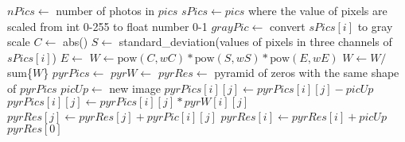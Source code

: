 \begin{algorithm}
\begin{algorithmic}[1]
  \State $nPics\gets$ number of photos in $pics$
  \State $sPics\gets pics$ where the value of pixels are scaled from int 0-255 to float number 0-1
    \State $grayPic\gets$ convert $sPics[i]$ to gray scale 
    \State $C\gets$ abs()
    \State $S\gets$ standard\_deviation(values of pixels in three channels of $sPics[i]$)
    \State $E\gets$ 
    \State $W\gets \mbox{pow}(C, wC) *\mbox{pow}(S, wS) *\mbox{pow}(E, wE)$
  \EndFor
  \State $W\gets W/$sum\{$W$\}
  \State $pyrPics\gets$ 
  \State $pyrW\gets$ 
  \State $pyrRes\gets$ pyramid of zeros with the same shape of $pyrPics$
  \State $picUp\gets$ new image
      \State {}
      \State $pyrPics[i][j]\gets pyrPics[i][j]-picUp$
    \EndFor
      \State $pyrPics[i][j]\gets pyrPics[i][j]*pyrW[i][j]$
      \State $pyrRes[j]\gets pyrRes[j]+pyrPic[i][j]$ 
    \EndFor
  \EndFor
    \State {}
    \State $pyrRes[i]\gets pyrRes[i]+picUp$
  \EndFor
  \State \Return $pyrRes[0]$
\EndFunction
\end{algorithmic}
\end{algorithm}

